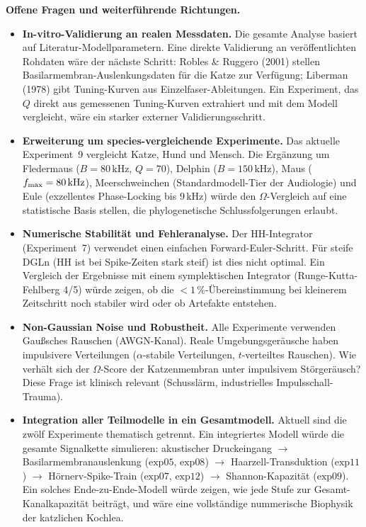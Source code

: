 ﻿\documentclass[12pt,a4paper,titlepage]{report}
\begin{document}
\textbf{Offene Fragen und weiterführende Richtungen.}
\begin{itemize}[leftmargin=2em]
  \item \textbf{In-vitro-Validierung an realen Messdaten.}
    Die gesamte Analyse basiert auf Literatur-Modellparametern.
    Eine direkte Validierung an veröffentlichten Rohdaten wäre
    der nächste Schritt:
    Robles \& Ruggero (2001) stellen Basilarmembran-Auslenkungsdaten
    für die Katze zur Verfügung;
    Liberman (1978) gibt Tuning-Kurven aus Einzelfaser-Ableitungen.
    Ein Experiment, das $Q$ direkt aus gemessenen Tuning-Kurven
    extrahiert und mit dem Modell vergleicht, wäre ein starker
    externer Validierungsschritt.
  \item \textbf{Erweiterung um species-vergleichende Experimente.}
    Das aktuelle Experiment~9 vergleicht Katze, Hund und Mensch.
    Die Ergänzung um Fledermaus ($B=80\,\mathrm{kHz}$, $Q=70$),
    Delphin ($B=150\,\mathrm{kHz}$), Maus ($f_{\rm max}=80\,\mathrm{kHz}$),
    Meerschweinchen (Standardmodell-Tier der Audiologie)
    und Eule (exzellentes Phase-Locking bis $9\,\mathrm{kHz}$)
    würde den $\Omega$-Vergleich auf eine statistische Basis stellen,
    die phylogenetische Schlussfolgerungen erlaubt.
  \item \textbf{Numerische Stabilität und Fehleranalyse.}
    Der HH-Integrator (Experiment~7) verwendet einen einfachen
    Forward-Euler-Schritt.
    Für steife DGLn (HH ist bei Spike-Zeiten stark steif)
    ist dies nicht optimal.
    Ein Vergleich der Ergebnisse mit einem symplektischen
    Integrator (Runge-Kutta-Fehlberg 4/5) würde zeigen,
    ob die $<1\,\%$-Übereinstimmung bei kleinerem Zeitschritt
    noch stabiler wird oder ob Artefakte entstehen.
  \item \textbf{Non-Gaussian Noise und Robustheit.}
    Alle Experimente verwenden Gaußsches Rauschen (AWGN-Kanal).
    Reale Umgebungsgeräusche haben impulsivere Verteilungen
    ($\alpha$-stabile Verteilungen, $t$-verteiltes Rauschen).
    Wie verhält sich der $\Omega$-Score der Katzenmembran unter
    impulsivem Störgeräusch?
    Diese Frage ist klinisch relevant (Schusslärm,
    industrielles Impulsschall-Trauma).
  \item \textbf{Integration aller Teilmodelle in ein Gesamtmodell.}
    Aktuell sind die zwölf Experimente thematisch getrennt.
    Ein integriertes Modell würde die gesamte Signalkette simulieren:
    akustischer Druckeingang $\to$ Basilarmembranauslenkung
    ($\mathrm{exp}05$, $\mathrm{exp}08$) $\to$ Haarzell-Transduktion
    ($\mathrm{exp}11$) $\to$ Hörnerv-Spike-Train ($\mathrm{exp}07$,
    $\mathrm{exp}12$) $\to$ Shannon-Kapazität ($\mathrm{exp}09$).
    Ein solches Ende-zu-Ende-Modell würde zeigen,
    wie jede Stufe zur Gesamt-Kanalkapazität beiträgt,
    und wäre eine vollständige nummerische Biophysik der katzlichen Kochlea.
\end{itemize}
\end{document}
